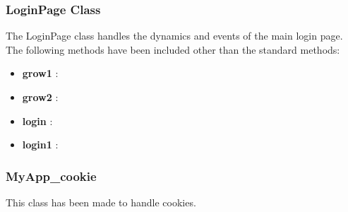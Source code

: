 \documentclass{article}
\begin{document}



\subsubsection{LoginPage Class}
\par\noindent The LoginPage class handles the dynamics and events of the main login page. The following methods have been included other than the standard methods:
\begin{itemize}
 \item \textbf{grow1} : 
 \item \textbf{grow2} : 
 \item \textbf{login} : 
 \item \textbf{login1} : 

\end{itemize}
\subsubsection{MyApp\_cookie}
\par\noindent This class has been made to handle cookies.

\subsubsection{}

\end{document}
